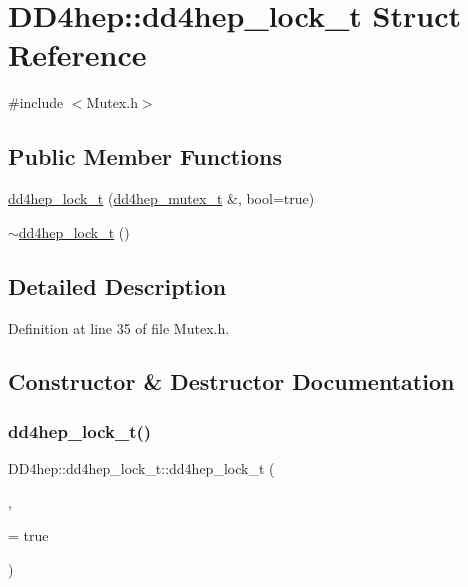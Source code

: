 \hypertarget{struct_d_d4hep_1_1dd4hep__lock__t}{}\section{D\+D4hep\+:\+:dd4hep\+\_\+lock\+\_\+t Struct Reference}
\label{struct_d_d4hep_1_1dd4hep__lock__t}


{\ttfamily \#include $<$Mutex.\+h$>$}

\subsection*{Public Member Functions}
\begin{DoxyCompactItemize}
\item 
\hyperlink{struct_d_d4hep_1_1dd4hep__lock__t_a6137b95ba1561f3e02626c363c98015f}{dd4hep\+\_\+lock\+\_\+t} (\hyperlink{struct_d_d4hep_1_1dd4hep__mutex__t}{dd4hep\+\_\+mutex\+\_\+t} \&, bool=true)
\item 
\hyperlink{struct_d_d4hep_1_1dd4hep__lock__t_a2da5cda9c173175ccd3c52a2a7c31e85}{$\sim$dd4hep\+\_\+lock\+\_\+t} ()
\end{DoxyCompactItemize}


\subsection{Detailed Description}


Definition at line 35 of file Mutex.\+h.



\subsection{Constructor \& Destructor Documentation}
\hypertarget{struct_d_d4hep_1_1dd4hep__lock__t_a6137b95ba1561f3e02626c363c98015f}{}\label{struct_d_d4hep_1_1dd4hep__lock__t_a6137b95ba1561f3e02626c363c98015f} 
\subsubsection{\texorpdfstring{dd4hep\+\_\+lock\+\_\+t()}{dd4hep\_lock\_t()}}
{\footnotesize\ttfamily D\+D4hep\+::dd4hep\+\_\+lock\+\_\+t\+::dd4hep\+\_\+lock\+\_\+t (\begin{DoxyParamCaption}\item[{\hyperlink{struct_d_d4hep_1_1dd4hep__mutex__t}{dd4hep\+\_\+mutex\+\_\+t} \&}]{,  }\item[{bool}]{ = {\ttfamily true} }\end{DoxyParamCaption})\hspace{0.3cm}{\ttfamily [inline]}}



